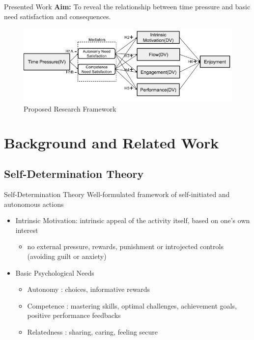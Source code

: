 \documentclass{beamer}
\begin{document}
\begin{frame}{Presented Work}
\textbf{Aim:} To reveal the relationship between time pressure and basic need satisfaction and consequences.

\begin{figure}[h]
\centering
\includegraphics [width=\textwidth,clip]{images/Figure_2_Framework}
\caption[hypotheses]{Proposed Research Framework}
\label {fig:hypotheses}
\end{figure}

\end{frame}

\section{Background and Related Work}

\subsection{Self-Determination Theory}
\begin{frame}{Self-Determination Theory}
Well-formulated framework of self-initiated and autonomous actions \cite{RyanDeci2000IntrinsicExtrinsic}
\begin{itemize}
  \item \alert{Intrinsic Motivation}:  intrinsic appeal of the activity itself, based on one's own interest
  \begin{itemize}
  	\item no external pressure, rewards, punishment or introjected controls (avoiding guilt or anxiety)
  \end{itemize}
  \item \alert{Basic Psychological Needs}
  	 \begin{itemize}
  		\item Autonomy : \textcolor{green!50!black}{choices, informative rewards}
  		\item Competence : \textcolor{green!50!black}{mastering skills, optimal challenges, achievement goals, positive performance feedbacks}
  		\item Relatedness : \textcolor{green!50!black}{sharing, caring, feeling secure}
  	\end{itemize}
  \end{itemize}
 
\end{frame}
\end{document}
